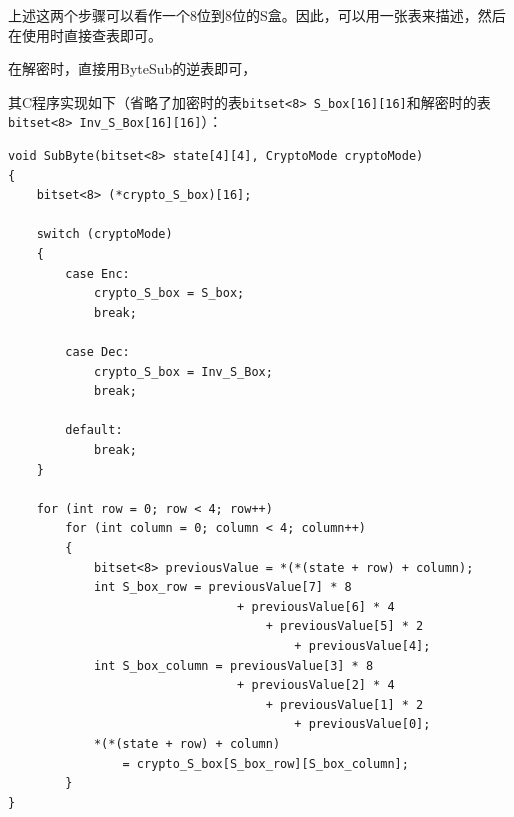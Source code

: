 上述这两个步骤可以看作一个8位到8位的S盒。因此，可以用一张表来描述，然后在使用时直接查表即可。 \par
在解密时，直接用ByteSub的逆表即可，\par
其C程序实现如下（省略了加密时的表\verb`bitset<8> S_box[16][16]`和解密时的表\verb`bitset<8> Inv_S_Box[16][16]`）：
\begin{prove}
\begin{verbatim}
void SubByte(bitset<8> state[4][4], CryptoMode cryptoMode)
{
    bitset<8> (*crypto_S_box)[16];

    switch (cryptoMode)
    {
        case Enc:
            crypto_S_box = S_box;
            break;
            
        case Dec:
            crypto_S_box = Inv_S_Box;
            break;
            
        default:
            break;
    }
    
    for (int row = 0; row < 4; row++)
        for (int column = 0; column < 4; column++)
        {
            bitset<8> previousValue = *(*(state + row) + column);
            int S_box_row = previousValue[7] * 8
                                + previousValue[6] * 4
                                    + previousValue[5] * 2
                                        + previousValue[4];
            int S_box_column = previousValue[3] * 8
                                + previousValue[2] * 4
                                    + previousValue[1] * 2
                                        + previousValue[0];
            *(*(state + row) + column)
                = crypto_S_box[S_box_row][S_box_column];
        }
}
\end{verbatim}
\end{prove}
